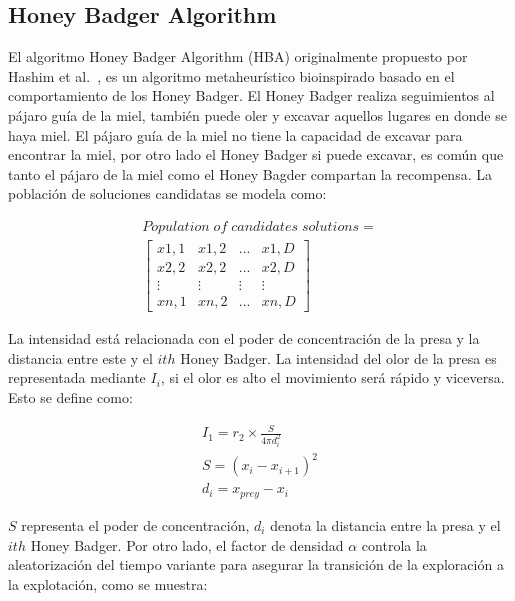 \documentclass[conference]{IEEEtran}
\begin{document}
\subsection{Honey Badger Algorithm}

\noindent El algoritmo Honey Badger Algorithm (HBA) originalmente propuesto por Hashim et al.~\cite{Hashim2022}, es un algoritmo metaheurístico bioinspirado basado en el comportamiento de los Honey Badger. El Honey Badger realiza seguimientos al pájaro guía de la miel, también puede oler y excavar aquellos lugares en donde se haya miel. El pájaro guía de la miel no tiene la capacidad de excavar para encontrar la miel, por otro lado el Honey Badger si puede excavar, es común que tanto el pájaro de la miel como el Honey Bagder compartan la recompensa. La población de soluciones candidatas se modela como:

\begin{equation}
	\begin{gathered}
		Population \;of\; candidates\; solutions=\\\begin{bmatrix}
			x1,1 & x1,2 & ... & x1,D  \\
			x2,2 & x2,2 & ... & x2,D  \\
			\vdots & \vdots & \vdots & \vdots \\
			xn,1 & xn,2 & ... & xn,D
		\end{bmatrix}
	\end{gathered}
	\label{eq27}
\end{equation}

\noindent La intensidad está relacionada con el poder de concentración de la presa y la distancia entre este y el $ith$ Honey Badger. La intensidad del olor de la presa es representada mediante $I_i$, si el olor es alto el movimiento será rápido y viceversa. Esto se define como:

\begin{equation}
	\begin{gathered}
		I_1 = r_2 \times \frac{S}{4 \pi d_i^2}\\
		S = (x_i -x_{i+1})^2\\
		d_i = x_{prey} - x_i
	\end{gathered}
	\label{eq28}
\end{equation}

\noindent $S$ representa el poder de concentración, $d_i$ denota la distancia entre la presa y el $ith$ Honey Badger. Por otro lado, el factor de densidad $\alpha$ controla la aleatorización del tiempo variante para asegurar la transición de la exploración a la explotación, como se muestra:
\end{document}
